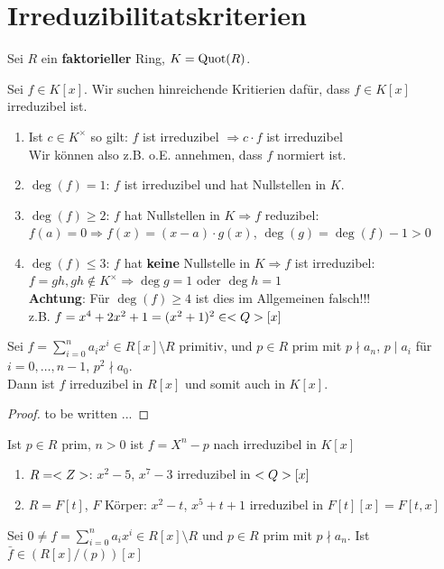 \section{Irreduzibilitatskriterien}

Sei $R$ ein \textbf{faktorieller} Ring, $K = \operatorname{Quot}(R)$.

\begin{remark}
	Sei $f \in K[x]$. Wir suchen hinreichende Kritierien dafür, dass $f \in K[x]$ irreduzibel ist.
	\begin{enumerate}%
		\item Ist $c \in K^{\times}$ so gilt: $f$ ist irreduzibel $\Longrightarrow c \cdot f$ ist irreduzibel\\
		Wir können also z.B. o.E. annehmen, dass $f$ normiert ist.
		\item $\deg(f) = 1$: $f$ ist irreduzibel und hat Nullstellen in $K$.
		\item $\deg(f) \ge 2$: $f$ hat Nullstellen in $K \Rightarrow f$ reduzibel:\\
		$f(a) = 0 \Rightarrow f(x) = (x-a)\cdot g(x)$, $\deg(g) = \deg(f) - 1 > 0$
		\item $\deg(f) \le 3$: $f$ hat \textbf{keine} Nullstelle in $K \Rightarrow f$ ist irreduzibel:\\
		$f=gh, gh \not \in K^{\times}\Rightarrow \deg g = 1$ oder $\deg h = 1$\\
		\textbf{Achtung}: Für $\deg(f) \ge 4$ ist dies im Allgemeinen falsch!!!\\
		z.B. $f = x^4 + 2x^2 + 1 = (x^2 +1)^2 \in <Q>[x]$
	\end{enumerate}
\end{remark}

\begin{proposition}
	Sei $f = \sum_{i=0}^{n} a_i x^i \in R[x]\setminus R$ primitiv, und $p \in R$ prim mit $p\nmid a_n$, $p \mid a_i$ für $i = 0, \dots,n-1$, $p^2 \nmid a_0$.\\
	Dann ist $f$ irreduzibel in $R[x]$ und somit auch in $K[x]$.
\end{proposition}

\begin{proof}
	to be written ...
\end{proof}

\begin{example}
	Ist $p \in R$ prim, $n > 0$ ist $f = X^n-p$ nach  irreduzibel in $K[x]$
	\begin{enumerate} %
		\item $R = <Z>$: $x^2 -5$, $x^7 - 3$ irreduzibel in $<Q>[x]$
		\item $R = F[t]$, $F$ Körper: $x^2-t$, $x^5 + t +1$ irreduzibel in $F[t][x] = F[t,x]$
	\end{enumerate}
\end{example}

\begin{proposition}[Reduktionskriterium]
	Sei $0 \neq f = \sum_{i=0}^{n} a_i x^i \in R[x]\setminus R$ und $p \in R$ prim mit $p \nmid a_n$. Ist $\bar{f} \in (R[x]/(p))[x]$
\end{proposition}